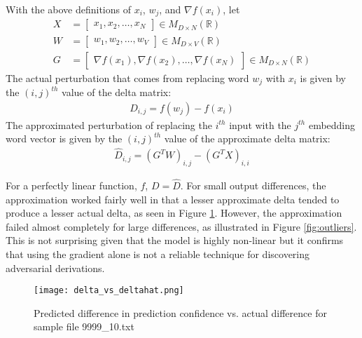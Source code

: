 \begin{definition}

With the above definitions of $x_i$, $w_j$, and $\nabla f(x_i)$, let
\begin{align}
X &= 
\begin{bmatrix}
x_1, x_2, \dots, x_N
\end{bmatrix} \in M_{D\times N}(\mathbb{R})\\
W &= 
\begin{bmatrix}
w_1, w_2, \dots, w_V
\end{bmatrix} \in M_{D\times V}(\mathbb{R})\\
G &= 
\begin{bmatrix}
\nabla f(x_1), \nabla f(x_2), \dots, \nabla f(x_N)
\end{bmatrix} \in M_{D\times N}(\mathbb{R})
\end{align}
\noindent
The actual perturbation that comes from replacing word $w_j$ with $x_i$ is given by the $(i,j)^{th}$ value of the delta matrix:
\begin{align}
D_{i,j} = f(w_j) - f(x_i)
\end{align}
The approximated perturbation of replacing the $i^{th}$ input with the $j^{th}$ embedding word vector is given by the $(i,j)^{th}$ value of the approximate delta matrix:
\begin{align}
    \hat{D}_{i,j} = (G^TW)_{i,j} - (G^TX)_{i,i}
\end{align}
\noindent
\end{definition}
\noindent
For a perfectly linear function, $f$, $D = \hat{D}$.  For small output differences, the approximation worked fairly well in that a lesser approximate delta tended to produce a lesser actual delta, as seen in Figure \ref{fig:dvhat}.  However, the approximation failed almost completely for large differences, as illustrated in Figure \ref{fig:outliers}.  This is not surprising given that the model is highly non-linear but it confirms that using the gradient alone is not a reliable technique for discovering adversarial derivations.

\begin{figure}
    \centering
    \texttt{[image: delta\_vs\_deltahat.png]}
    \caption{Predicted difference in prediction confidence vs. actual difference for sample file 9999\_10.txt}
    \label{fig:dvhat}
\end{figure}

